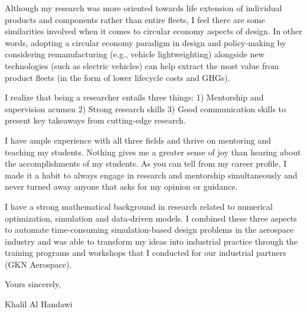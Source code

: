 \documentclass[12pt]{article} %
\begin{document}
\medskip %

Although my research was more oriented towards life extension of individual products and components rather than entire fleets, I feel there are some similarities involved when it comes to circular economy aspects of design. In other words, adopting a circular economy paradigm in design and policy-making by considering remanufacturing (e.g., vehicle lightweighting) alongside new technologies (such as electric vehicles) can help extract the most value from product fleets (in the form of lower lifecycle costs and GHGs).

\medskip %

I realize that being a researcher entails three things: 1) Mentorship and supervision acumen 2) Strong research skills 3) Good communication skills to present key takeaways from cutting-edge research.

\medskip %

I have ample experience with all three fields and thrive on mentoring and teaching my students. Nothing gives me a greater sense of joy than hearing about the accomplishments of my students. As you can tell from my career profile, I made it a habit to always engage in research and mentorship simultaneously and never turned away anyone that asks for my opinion or guidance.

\medskip %

I have a strong mathematical background in research related to numerical optimization, simulation and data-driven models. I combined these three aspects to automate time-consuming simulation-based design problems in the aerospace industry and was able to transform my ideas into industrial practice through the training programs and workshops that I conducted for our industrial partners (GKN Aerospace).

\medskip %

Yours sincerely,

\medskip %

Khalil Al Handawi

\medskip %

\end{document}
